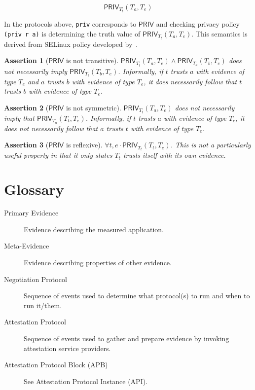 \documentclass[10pt]{article}
\newtheorem{assertion}{Assertion}
\begin{document}
\[\mathsf{PRIV}_{T_t}(T_a,T_e)\]

In the protocols above, \Verb+priv+ corresponds to $\mathsf{PRIV}$ and
checking privacy policy \Verb+(priv r a)+ is determining the truth
value of $\mathsf{PRIV}_{T_t}(T_a,T_e)$.  This semantics is derived
from SELinux policy developed by~\citet{Hicks:07:A-logical-speci}.

\begin{assertion}[$\mathsf{PRIV}$ is not transitive]
  $\mathsf{PRIV}_{T_t}(T_a,T_e)\wedge\mathsf{PRIV}_{T_a}(T_b,T_e)$
  does not necessarily imply $\mathsf{PRIV}_{T_t}(T_b,T_e)$.
  Informally, if $t$ trusts $a$ with evidence of type $T_e$ and $a$
  trusts $b$ with evidence of type $T_e$, it does necessarily follow
  that $t$ trusts $b$ with evidence of type $T_e$.
\end{assertion}

\begin{assertion}[$\mathsf{PRIV}$ is not symmetric]
  $\mathsf{PRIV}_{T_t}(T_a,T_e)$ does not necessarily imply that
  $\mathsf{PRIV}_{T_a}(T_t,T_e)$.  Informally, if $t$ trusts $a$ with
  evidence of type $T_e$, it does not necessarily follow that $a$
  trusts $t$ with evidence of type $T_e$.
\end{assertion}

\begin{assertion}[$\mathsf{PRIV}$ is reflexive]
  $\forall t,e\cdot\mathsf{PRIV}_{T_t}(T_t,T_e)$. This is not a
  particularly useful property in that it only states $T_t$ trusts
  itself with its own evidence.
\end{assertion}

\appendix

\section*{Glossary}

\begin{description}
\item[Primary Evidence] Evidence describing the measured application.
\item[Meta-Evidence] Evidence describing properties of other evidence.
\item[Negotiation Protocol] Sequence of events used to determine what
  protocol(s) to run and when to run it/them.
\item[Attestation Protocol] Sequence of events used to gather and
  prepare evidence by invoking attestation service providers.
\item[Attestation Protocol Block (APB)] See Attestation Protocol
  Instance (API).
\end{description}
\end{document}
